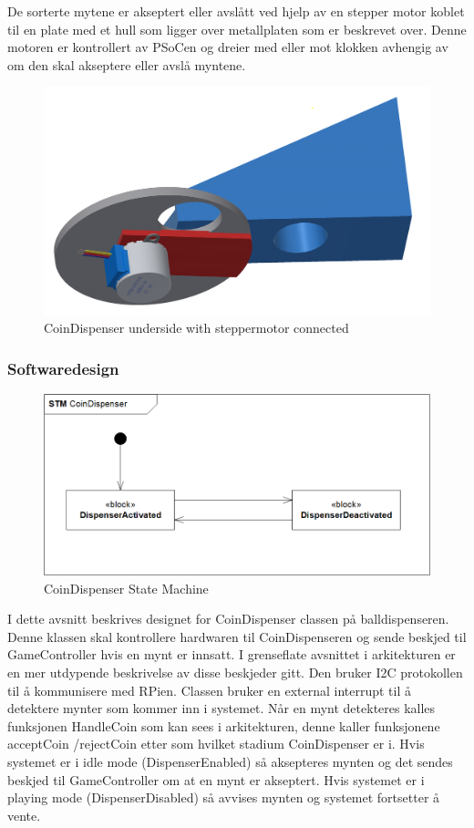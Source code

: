 \documentclass[Rapport/BallDispenser/BallDispenser.tex]{subfiles}
\begin{document}
De sorterte mytene er akseptert eller avslått ved hjelp av en stepper motor koblet til en plate med et hull som ligger over metallplaten som er beskrevet over. Denne motoren er kontrollert av PSoCen og dreier med eller mot klokken avhengig av om den skal akseptere eller avslå myntene.

\begin{figure}[H]
    \centering
    \includegraphics[width=1\textwidth]{Rapport/BallDispenser/CoinDispenser/graphics/coinmaster-under.png}
    \caption{CoinDispenser underside with steppermotor connected}
    \label{fig:my_label}
\end{figure}

\subsubsection{Softwaredesign}
\begin{figure}[H]
    \centering
    \includegraphics[width=1\textwidth]{Rapport/BallDispenser/CoinDispenser/graphics/CoinSTM.png}
    \caption{CoinDispenser State Machine}
    \label{fig:CoinSTM}
\end{figure}
I dette avsnitt beskrives designet for CoinDispenser classen på balldispenseren. Denne klassen skal kontrollere hardwaren til CoinDispenseren og sende beskjed til GameController hvis en mynt er innsatt. I grenseflate avsnittet i arkitekturen er en mer utdypende beskrivelse av disse beskjeder gitt. Den bruker I2C protokollen til å kommunisere med RPien. Classen bruker en external interrupt til å detektere mynter som kommer inn i systemet. Når en mynt detekteres kalles funksjonen HandleCoin som kan sees i arkitekturen, denne kaller funksjonene acceptCoin /rejectCoin etter som hvilket stadium CoinDispenser er i. Hvis systemet er i idle mode (DispenserEnabled) så aksepteres mynten og det sendes beskjed til GameController om at en mynt er akseptert. Hvis systemet er i playing mode (DispenserDisabled) så avvises mynten og systemet fortsetter å vente.
\end{document}
